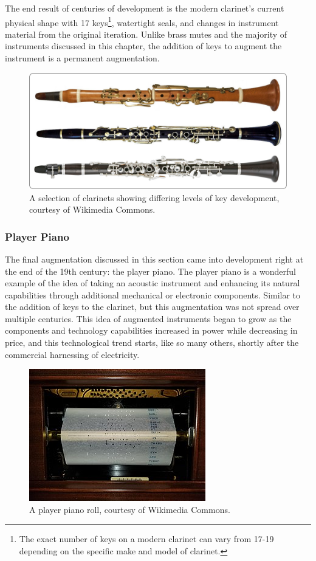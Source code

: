 The end result of centuries of development is the modern clarinet's current physical shape with 17 keys\footnote{The exact number of keys on a modern clarinet can vary from 17-19 depending on the specific make and model of clarinet.}, watertight seals, and changes in instrument material from the original iteration. Unlike brass mutes and the majority of instruments discussed in this chapter, the addition of keys to augment the instrument is a permanent augmentation. 

\begin{figure}
    \centering
    \includegraphics[scale=0.07]{diagrams/M-A-O-clarinets.jpg}
    \caption{A selection of clarinets showing differing levels of key development, courtesy of Wikimedia Commons.}
    \label{fig:clKeys} %
\end{figure}


\subsubsection{Player Piano}

The final augmentation discussed in this section came into development right at the end of the 19th century: the player piano. The player piano is a wonderful example of the idea of taking an acoustic instrument and enhancing its natural capabilities through additional mechanical or electronic components. Similar to the addition of keys to the clarinet, but this augmentation was not spread over multiple centuries. This idea of augmented instruments began to grow as the components and technology capabilities increased in power while decreasing in price, and this technological trend starts, like so many others, shortly after the commercial harnessing of electricity.

\begin{figure}
    \centering
    \includegraphics[scale=0.8]{diagrams/PlayerPianoRoll.jpg}
    \caption{A player piano roll, courtesy of Wikimedia Commons.}
    \label{fig:pianoroll} %
\end{figure}

